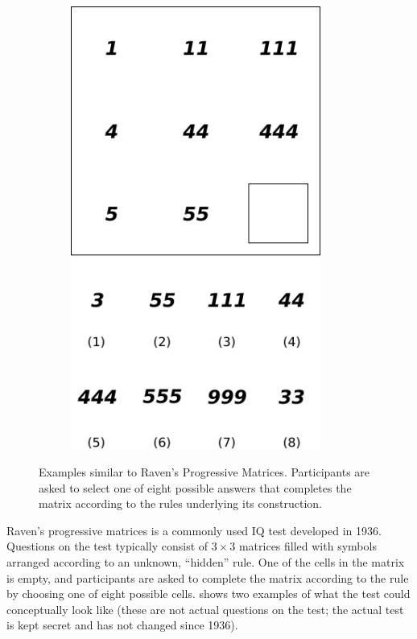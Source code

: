 \documentclass[10pt,letterpaper,oneside]{article}
\begin{document}
\begin{figure}[t]
\begin{subfigure}{0.33\textwidth}
		\includegraphics[width=0.9\textwidth]{media/ravens_example_c.pdf}%
		\caption{}%
		\label{fig:ravens_example_c}%
	\end{subfigure}
	\caption{Examples similar to Raven's Progressive Matrices. Participants are asked to select one of eight possible answers that completes the matrix according to the rules underlying its construction.}
	\label{fig:ravens_example}
\end{figure}

Raven's progressive matrices is a commonly used IQ test developed in 1936. Questions on the test typically consist of $3 \times 3$ matrices filled with symbols arranged according to an unknown, \enquote{hidden} rule. One of the cells in the matrix is empty, and participants are asked to complete the matrix according to the rule by choosing one of eight possible cells.  shows two examples of what the test could conceptually look like (these are not actual questions on the test; the actual test is kept secret and has not changed since 1936).
\end{document}
